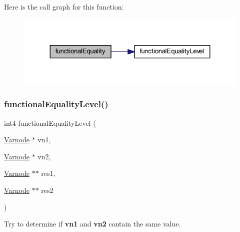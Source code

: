 Here is the call graph for this function\+:
\nopagebreak
\begin{figure}[H]
\begin{center}
\leavevmode
\includegraphics[width=324pt]{op_8hh_acabcf7c5d200986ab0afdbf80b7bd933_cgraph}
\end{center}
\end{figure}
\mbox{\label{op_8hh_a1761d74696f37bc47ecdbd773ddbabec}} 
\subsubsection{\texorpdfstring{functionalEqualityLevel()}{functionalEqualityLevel()}}
{\footnotesize\ttfamily int4 functional\+Equality\+Level (\begin{DoxyParamCaption}\item[{\mbox{\hyperlink{class_varnode}{Varnode}} $\ast$}]{vn1,  }\item[{\mbox{\hyperlink{class_varnode}{Varnode}} $\ast$}]{vn2,  }\item[{\mbox{\hyperlink{class_varnode}{Varnode}} $\ast$$\ast$}]{res1,  }\item[{\mbox{\hyperlink{class_varnode}{Varnode}} $\ast$$\ast$}]{res2 }\end{DoxyParamCaption})}



Try to determine if {\bfseries{vn1}} and {\bfseries{vn2}} contain the same value. 

